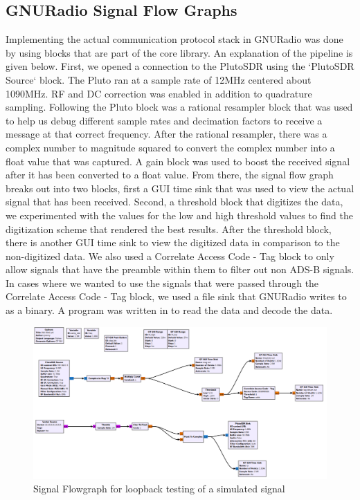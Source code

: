 \documentclass[conference, onecolumn]{IEEEtran}
\begin{document}
\subsection{GNURadio Signal Flow Graphs}
Implementing the actual communication protocol stack in GNURadio was done by using blocks that are part of the core library. An explanation of the pipeline is given below. First, we opened a connection to the PlutoSDR using the `PlutoSDR Source` block. The Pluto ran at a sample rate of 12MHz centered about 1090MHz. RF and DC correction was enabled in addition to quadrature sampling. Following the Pluto block was a rational resampler block that was used to help us debug different sample rates and decimation factors to receive a message at that correct frequency. After the rational resampler, there was a complex number to magnitude squared to convert the complex number into a float value that was captured. A gain block was used to boost the received signal after it has been converted to a float value. From there, the signal flow graph breaks out into two blocks, first a GUI time sink that was used to view the actual signal that has been received. Second, a threshold block that digitizes the data, we experimented with the values for the low and high threshold values to find the digitization scheme that rendered the best results. After the threshold block, there is another GUI time sink to view the digitized data in comparison to the non-digitized data. We also used a Correlate Access Code - Tag block to only allow signals that have the preamble within them to filter out non ADS-B signals. In cases where we wanted to use the signals that were passed through the Correlate Access Code - Tag block, we used a file sink that GNURadio writes to as a binary. A program was written in to read the data and decode the data.

\begin{figure}
  \begin{center}
    \includegraphics[width=\textwidth]{./figures/fig_gnuradio_loopback_test.png}
  \end{center}
  \caption{Signal Flowgraph for loopback testing of a simulated signal}\label{fig:loopback_grc}
\end{figure}
\end{document}
